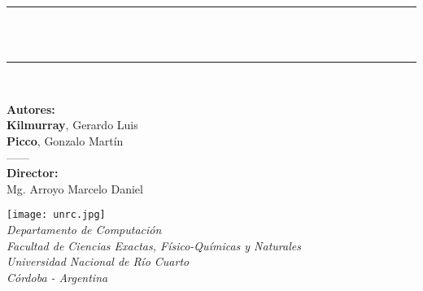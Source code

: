 \newcommand{\HRule}{\rule{\linewidth}{0.6mm}}
\begin{titlepage}

\begin{center}


\vspace*{1.5cm}
\HRule \\
  {\Large{\textbf{}}}
  \vspace*{0.3cm}
  {\Huge\textbf{\maggen\\}}
  \vspace*{0.2cm}
 
\HRule \\[0.5cm]

\vspace*{1.2cm}

\large{\textbf{Autores:}\\ \textbf{Kilmurray}, Gerardo Luis\\ \textbf{Picco}, Gonzalo Martín\\}
\vspace*{0.8cm}
{------\\}
\vspace*{0.8cm}
\large{\textbf{Director:}\\ Mg. Arroyo Marcelo Daniel}

\vspace*{2.2cm}
 \texttt{[image: unrc.jpg]}\\
\vspace*{0.5cm}
\normalsize{\textit{Departamento de Computación\\
                    Facultad de Ciencias Exactas, Físico-Químicas y Naturales\\
                    Universidad Nacional de Río Cuarto\\
                    Córdoba - Argentina}}
\end{center}
\end{titlepage}
\sloppy

\titlepage
